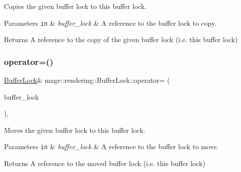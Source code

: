 Copies the given buffer lock to this buffer lock.


\begin{DoxyParams}[1]{Parameters}
\mbox{\tt in}  & {\em buffer\+\_\+lock} & A reference to the buffer lock to copy. \\
\hline
\end{DoxyParams}
\begin{DoxyReturn}{Returns}
A reference to the copy of the given buffer lock (i.\+e. this buffer lock) 
\end{DoxyReturn}
\mbox{\label{classmage_1_1rendering_1_1_buffer_lock_a625ec83f70daddaedc2cb0533b982c74}} 
\subsubsection{\texorpdfstring{operator=()}{operator=()}\hspace{0.1cm}{\footnotesize\ttfamily [2/2]}}
{\footnotesize\ttfamily \mbox{\hyperlink{classmage_1_1rendering_1_1_buffer_lock}{Buffer\+Lock}}\& mage\+::rendering\+::\+Buffer\+Lock\+::operator= (\begin{DoxyParamCaption}\item[{\mbox{\hyperlink{classmage_1_1rendering_1_1_buffer_lock}{Buffer\+Lock}} \&\&}]{buffer\+\_\+lock }\end{DoxyParamCaption})\hspace{0.3cm}{\ttfamily [default]}, {\ttfamily [noexcept]}}

Moves the given buffer lock to this buffer lock.


\begin{DoxyParams}[1]{Parameters}
\mbox{\tt in}  & {\em buffer\+\_\+lock} & A reference to the buffer lock to move. \\
\hline
\end{DoxyParams}
\begin{DoxyReturn}{Returns}
A reference to the moved buffer lock (i.\+e. this buffer lock) 
\end{DoxyReturn}
\mbox{\label{classmage_1_1rendering_1_1_buffer_lock_a19ebd740876eea3b7d418bef505c47d7}} 
